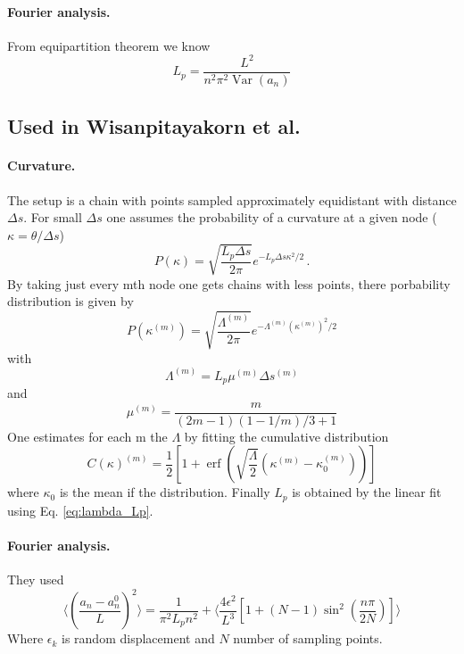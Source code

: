 \documentclass[twocolumn,aps,prxlife,longbibliography,amsmath,amssymb,floatfix,superscriptaddress,showkeys]{revtex4-2}
\begin{document}
\paragraph{Fourier analysis.} 
From equipartition theorem we know \cite{gittes_flexural_1993}
\begin{equation}
  L_p = \frac{L^2}{n^2 \pi^2 \operatorname{Var}(a_n)}
\end{equation}

\subsection{Used in Wisanpitayakorn et al.~\cite{wisanpitayakorn_measurement_2022}}
\paragraph{Curvature.}
The setup is a chain with points sampled approximately equidistant with distance $\Delta s$.
For small $\Delta s$ one assumes the probability of a curvature at a given node ($\kappa=\theta/\Delta s$)
\begin{equation}
  P(\kappa) = \sqrt{\frac{L_p \Delta s}{2 \pi}} e^{-L_p \Delta s \kappa^2/2} \, .
\end{equation}
By taking just every mth node one gets chains with less points, there porbability distribution is given by
\begin{equation}
  P(\kappa^{(m)})=\sqrt{\frac{\Lambda^{(m)}}{2\pi}}e^{-\Lambda^{(m)} (\kappa^{(m)})^2/2}
\end{equation}
with \begin{equation}
  \Lambda^{(m)} = L_p \mu^{(m)} \Delta s^{(m)}
  \label{eq:lambda_Lp}
\end{equation}
and
\begin{equation}
  \mu^{(m)} = \frac{m}{(2m - 1)(1 - 1/m)/3 + 1}
\end{equation}
One estimates for each m the $\Lambda$ by fitting the cumulative distribution
\begin{equation}
  C(\kappa)^{(m)} = \frac{1}{2}\left[1 +  \operatorname{erf}\left( \sqrt{\frac{\Lambda}{2}}(\kappa^{(m)} - \kappa_0^{(m)})\right)\right]
\end{equation}
where $\kappa_0$ is the mean if the distribution.
Finally $L_p$ is obtained by the linear fit using Eq. \ref{eq:lambda_Lp}.

\paragraph{Fourier analysis.}
They used
\begin{equation}
  \langle (\frac{a_n - a_n^0}{L})^2 \rangle = \frac{1}{\pi^2 L_p n^2} + \langle \frac{4 \epsilon^2}{L^3}[1 + (N-1) \sin^2(\frac{n\pi}{2N})] \rangle
\end{equation}
 Where $\epsilon_k$ is random displacement and $N$ number of sampling points. 
\end{document}
